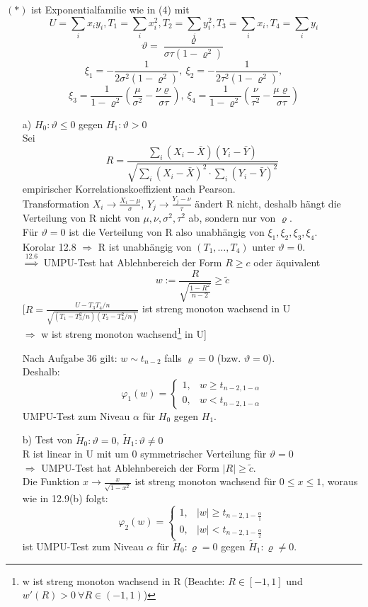 \documentclass[a4paper,11pt,twoside,titlepage]{article}
\begin{document}
$(\ast)$ ist Exponentialfamilie wie in (4) mit $$U=\sum_ix_iy_i, T_1=\sum_ix_i^2, T_2=\sum_iy_i^2, T_3=\sum_ix_i, T_4=\sum_iy_i$$
\[\vartheta=\frac{\varrho}{\sigma\tau(1-\varrho^2)}\]\[\xi_1=-\frac{1}{2\sigma^2(1-\varrho^2)},\ \xi_2=-\frac{1}{2\tau^2(1-\varrho^2)},\]\[\xi_3=\frac{1}{1-\varrho^2}(\frac{\mu}{\sigma^2}-\frac{\nu\varrho}{\sigma\tau}),\ \xi_4=\frac{1}{1-\varrho^2}(\frac{\nu}{\tau^2}-\frac{\mu\varrho}{\sigma\tau})\]
\begin{itemize}
\item[a)] $H_0:\vartheta\leq 0$ gegen $H_1:\vartheta>0$\\
Sei
\[R=\frac{\sum_i(X_i-\bar X)(Y_i-\bar Y)}{\sqrt{\sum_i(X_i-\bar X)^2\cdot\sum_i(Y_i-\bar Y)^2}}\]
empirischer Korrelationskoeffizient nach Pearson.\\
Transformation $X_i\to\frac{X_i-\mu}{\sigma}$, $Y_j\to\frac{Y_j-\nu}{\tau}$ ändert R nicht, deshalb hängt die Verteilung von R nicht von $\mu,\nu,\sigma^2,\tau^2$ ab, sondern nur von $\varrho$.\\
Für $\vartheta=0$ ist die Verteilung von R also unabhängig von $\xi_1,\xi_2,\xi_3,\xi_4$.\\
Korolar 12.8 $\Rightarrow$ R ist unabhängig von $(T_1,\ldots,T_4)$ unter $\vartheta=0$.\\
$\stackrel{12.6}{\Rightarrow}$ UMPU-Test hat Ablehnbereich der Form $R\geq c$ oder äquivalent 
\[w:=\frac{R}{\sqrt{\frac{1-R^2}{n-2}}}\geq \tilde c\]
[$R=\frac{U-T_3T_4/n}{\sqrt{(T_1-T_3^2/n)(T_2-T_4^2/n)}}$ ist streng monoton wachsend in U\\ $\Rightarrow$ w ist streng monoton wachsend\footnote{w ist streng monoton wachsend in R (Beachte: $R\in[-1,1]$ und $w'(R)>0\ \forall R\in(-1,1)$)} in U]

Nach Aufgabe 36 gilt: $w\sim t_{n-2}$ falls $\varrho=0$ (bzw. $\vartheta=0$).\\
Deshalb:
\[\varphi_1(w)=\left\{\begin{array}{cl}1,&w\geq t_{n-2,1-\alpha}\\0,&w<t_{n-2,1-\alpha}\end{array}\right.\]
UMPU-Test zum Niveau $\alpha$ für $H_0$ gegen $H_1$.
\item[b)] Test von $\tilde H_0:\vartheta=0$, $\tilde H_1:\vartheta\neq0$\\
R ist linear in U mit um 0 symmetrischer Verteilung für $\vartheta=0$\\ $\Rightarrow$ UMPU-Test hat Ablehnbereich der Form $|R|\geq \tilde c$.\\
Die Funktion $x\to\frac{x}{\sqrt{1-x^2}}$ ist streng monoton wachsend für $0\leq x\leq 1$, woraus wie in 12.9(b) folgt:
\[\varphi_2(w)=\left\{\begin{array}{cl}1,&|w|\geq t_{n-2,1-\frac\alpha1}\\0,&|w|<t_{n-2,1-\frac\alpha2}\end{array}\right.\]
ist UMPU-Test zum Niveau $\alpha$ für $\tilde H_0:\varrho=0$ gegen $\tilde H_1:\varrho\neq 0$.
\end{itemize}
\end{document}
